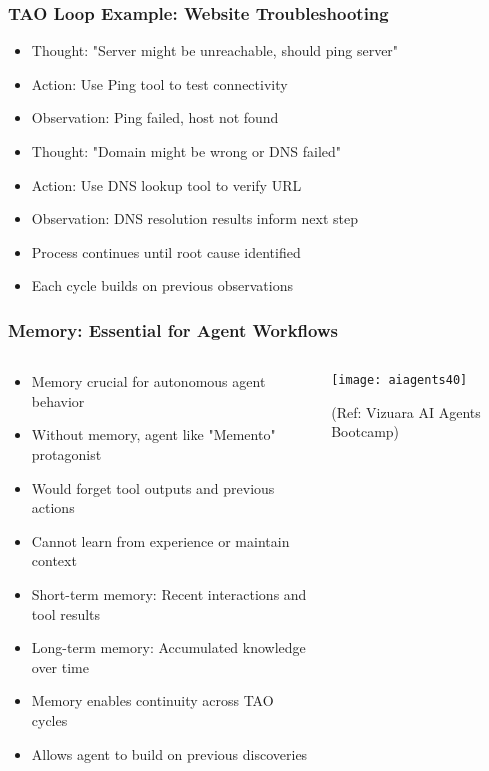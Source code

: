 \begin{frame}[fragile]\frametitle{TAO Loop Example: Website Troubleshooting}
      \begin{itemize}
	  \item Thought: "Server might be unreachable, should ping server"
	  \item Action: Use Ping tool to test connectivity
	  \item Observation: Ping failed, host not found
	  \item Thought: "Domain might be wrong or DNS failed"
	  \item Action: Use DNS lookup tool to verify URL
	  \item Observation: DNS resolution results inform next step
	  \item Process continues until root cause identified
	  \item Each cycle builds on previous observations
	  \end{itemize}
\end{frame}

\begin{frame}[fragile]\frametitle{Memory: Essential for Agent Workflows}

\begin{columns}
    \begin{column}[T]{0.6\linewidth}
      \begin{itemize}
	  \item Memory crucial for autonomous agent behavior
	  \item Without memory, agent like "Memento" protagonist
	  \item Would forget tool outputs and previous actions
	  \item Cannot learn from experience or maintain context
	  \item Short-term memory: Recent interactions and tool results
	  \item Long-term memory: Accumulated knowledge over time
	  \item Memory enables continuity across TAO cycles
	  \item Allows agent to build on previous discoveries
	  \end{itemize}

    \end{column}
    \begin{column}[T]{0.4\linewidth}
		\begin{center}
		\texttt{[image: aiagents40]}

		{\tiny (Ref: Vizuara AI Agents Bootcamp)}

		\end{center}	
    \end{column}
  \end{columns}
  
\end{frame}

